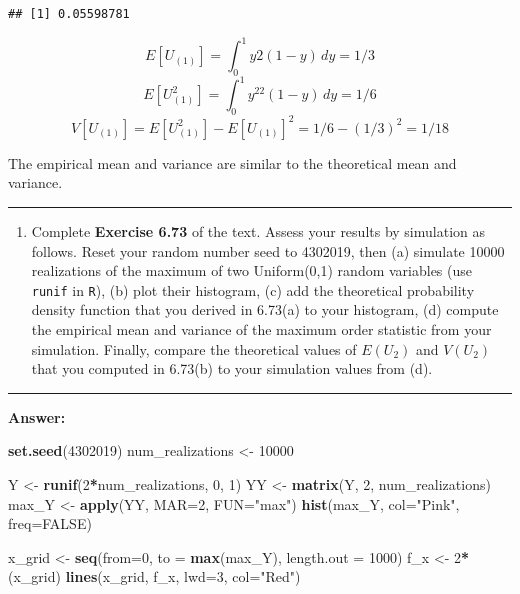 \documentclass[]{article}
\newenvironment{Shaded}{\begin{snugshade}}{\end{snugshade}}
\newcommand{\KeywordTok}[1]{\textcolor[rgb]{0.13,0.29,0.53}{\textbf{#1}}}
\newcommand{\DataTypeTok}[1]{\textcolor[rgb]{0.13,0.29,0.53}{#1}}
\newcommand{\DecValTok}[1]{\textcolor[rgb]{0.00,0.00,0.81}{#1}}
\newcommand{\StringTok}[1]{\textcolor[rgb]{0.31,0.60,0.02}{#1}}
\newcommand{\OtherTok}[1]{\textcolor[rgb]{0.56,0.35,0.01}{#1}}
\newcommand{\OperatorTok}[1]{\textcolor[rgb]{0.81,0.36,0.00}{\textbf{#1}}}
\newcommand{\NormalTok}[1]{#1}
\providecommand{\tightlist}{%
  \setlength{\itemsep}{0pt}\setlength{\parskip}{0pt}}
\begin{document}
\begin{verbatim}
## [1] 0.05598781
\end{verbatim}

\[
E[U_{(1)}] = \int_0^1 y2(1-y)\,dy = 1/3
\] \[
E[U_{(1)}^2] = \int_0^1y^22(1-y)\,dy = 1/6
\] \[
V[U_{(1)}] = E[U_{(1)}^2] - E[U_{(1)}]^2 = 1/6 - (1/3)^2 = 1/18
\]

The empirical mean and variance are similar to the theoretical mean and
variance.

\begin{center}\rule{0.5\linewidth}{\linethickness}\end{center}

\begin{enumerate}
\def\labelenumi{\arabic{enumi}.}
\setcounter{enumi}{2}
\tightlist
\item
  Complete \textbf{Exercise 6.73} of the text. Assess your results by
  simulation as follows. Reset your random number seed to 4302019, then
  (a) simulate 10000 realizations of the maximum of two Uniform(0,1)
  random variables (use \texttt{runif} in \texttt{R}), (b) plot their
  histogram, (c) add the theoretical probability density function that
  you derived in 6.73(a) to your histogram, (d) compute the empirical
  mean and variance of the maximum order statistic from your simulation.
  Finally, compare the theoretical values of \(E(U_2)\) and \(V(U_2)\)
  that you computed in 6.73(b) to your simulation values from (d).
\end{enumerate}

\begin{center}\rule{0.5\linewidth}{\linethickness}\end{center}

\textbf{Answer:}

\begin{Shaded}
\begin{Highlighting}[]
\KeywordTok{set.seed}\NormalTok{(}\DecValTok{4302019}\NormalTok{)}
\NormalTok{num_realizations <-}\StringTok{ }\DecValTok{10000}


\NormalTok{Y <-}\StringTok{ }\KeywordTok{runif}\NormalTok{(}\DecValTok{2}\OperatorTok{*}\NormalTok{num_realizations, }\DecValTok{0}\NormalTok{, }\DecValTok{1}\NormalTok{)}
\NormalTok{YY <-}\StringTok{ }\KeywordTok{matrix}\NormalTok{(Y, }\DecValTok{2}\NormalTok{, num_realizations)}
\NormalTok{max_Y <-}\StringTok{ }\KeywordTok{apply}\NormalTok{(YY, }\DataTypeTok{MAR=}\DecValTok{2}\NormalTok{, }\DataTypeTok{FUN=}\StringTok{"max"}\NormalTok{)}
\KeywordTok{hist}\NormalTok{(max_Y, }\DataTypeTok{col=}\StringTok{"Pink"}\NormalTok{, }\DataTypeTok{freq=}\OtherTok{FALSE}\NormalTok{)}

\NormalTok{x_grid <-}\StringTok{ }\KeywordTok{seq}\NormalTok{(}\DataTypeTok{from=}\DecValTok{0}\NormalTok{, }\DataTypeTok{to =} \KeywordTok{max}\NormalTok{(max_Y), }\DataTypeTok{length.out =} \DecValTok{1000}\NormalTok{)}
\NormalTok{f_x <-}\StringTok{ }\DecValTok{2}\OperatorTok{*}\NormalTok{(x_grid)}
\KeywordTok{lines}\NormalTok{(x_grid, f_x, }\DataTypeTok{lwd=}\DecValTok{3}\NormalTok{, }\DataTypeTok{col=}\StringTok{"Red"}\NormalTok{)}
\end{Highlighting}
\end{Shaded}
\end{document}
